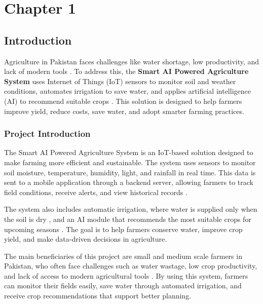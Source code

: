 
\setcounter{chapter}{1}
\setcounter{figure}{0}
\setcounter{table}{0}
\chapter*{Chapter 1}
\section{Introduction}

Agriculture in Pakistan faces challenges like water shortage, low 
productivity, and lack of modern tools \cite{shafi2019precision}. 
To address this, the \textbf{Smart AI Powered Agriculture System} 
uses Internet of Things (IoT) sensors to monitor soil and weather 
conditions, automates irrigation to save water, and applies 
artificial intelligence (AI) to recommend suitable crops 
\cite{farooq2019survey}. This solution is designed to help farmers 
improve yield, reduce costs, save water, and adopt smarter farming 
practices.

\subsection{Project Introduction}

The Smart AI Powered Agriculture System is an IoT-based solution 
designed to make farming more efficient and sustainable. The system 
uses sensors to monitor soil moisture, temperature, humidity, light, 
and rainfall in real time. This data is sent to a mobile application 
through a backend server, allowing farmers to track field conditions, 
receive alerts, and view historical records \cite{mohanraj2016field}.

The system also includes automatic irrigation, where water is 
supplied only when the soil is dry \cite{garcia2020iot}, and an AI 
module that recommends the most suitable crops for upcoming seasons 
\cite{musanase2023data}. The goal is to help farmers conserve water, 
improve crop yield, and make data-driven decisions in agriculture.

The main beneficiaries of this project are small and medium scale 
farmers in Pakistan, who often face challenges such as water wastage, 
low crop productivity, and lack of access to modern agricultural 
tools \cite{zia2021experimental}. By using this system, farmers can 
monitor their fields easily, save water through automated irrigation, 
and receive crop recommendations that support better planning.


